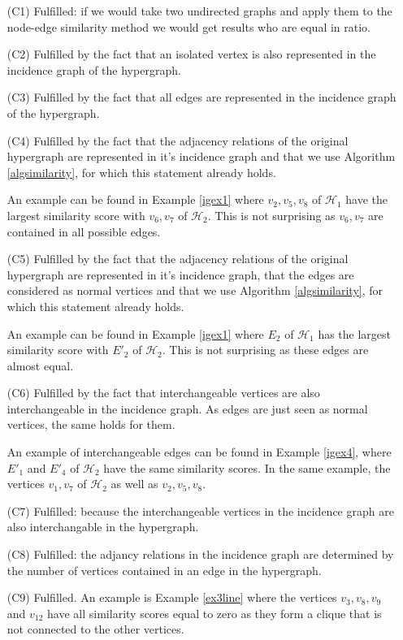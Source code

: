\documentclass[a4paper,11pt]{report}
\newcommand{\hgrafeen}{\mathcal{H}}
\begin{document}
\begin{itemize}
  \item[(C1)] Fulfilled: if we would take two undirected graphs and apply them to the node-edge similarity method
  we would get results who are equal in ratio.  
    \item[(C2)] Fulfilled by the fact that an isolated vertex is also 
    represented in the incidence graph of the hypergraph.
    \item[(C3)] Fulfilled by the fact that all edges are 
    represented in the incidence graph of the hypergraph.
  \item[(C4)] Fulfilled by the fact that the adjacency relations of the original hypergraph are represented in it's 
  incidence graph and that we use Algorithm \ref{algsimilarity}, for which this 
  statement already holds.
  
  An example can be found in Example \ref{igex1} where $v_2, v_5, v_8$ of $\hgrafeen_1$ 
  have the largest similarity score with $v_6, v_7$ of $\hgrafeen_2$. This is 
  not surprising as $v_6, v_7$ are contained in all possible edges.
  \item[(C5)] Fulfilled by the fact that the adjacency relations of the original hypergraph are represented in it's 
  incidence graph, that the edges are considered as normal vertices and that we use Algorithm \ref{algsimilarity}, for which this 
  statement already holds.
  
  
  An example can be found in Example \ref{igex1} where $E_2$ of $\hgrafeen_1$ 
  has the largest similarity score with $E'_2$ of $\hgrafeen_2$. This is 
  not surprising as these edges are almost equal.


  \item[(C6)] Fulfilled by the fact that interchangeable vertices are also 
  interchangeable in the incidence graph. As edges are just seen as normal 
  vertices, the same holds for them. 
  
  An example of interchangeable edges can be found in Example \ref{igex4}, where 
  $E'_1$ and $E'_4$ of $\hgrafeen_2$ have the same similarity scores. In the same 
  example, the vertices $v_1, v_7$ of $\hgrafeen_2$ as well as $v_2, v_5, v_8$.
  \item[(C7)] Fulfilled: because the interchangeable vertices in the incidence graph are also interchangable in the hypergraph.
  \item[(C8)] Fulfilled: the adjancy relations in the incidence graph are determined by the number of vertices
  contained in an edge in the hypergraph.
    \item[(C9)] Fulfilled. An example is Example \ref{ex3line} where the 
    vertices $v_3, v_8, v_9$ and $v_12$ have all similarity scores equal to zero 
    as they form a clique that is not connected to the other vertices.
  \end{itemize}  
\end{document}
